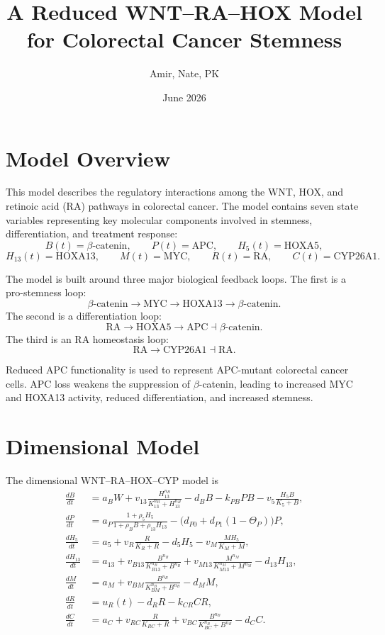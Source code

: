 \documentclass[11pt]{article}
\title{A Reduced WNT--RA--HOX Model for Colorectal Cancer Stemness}
\author{Amir, Nate, PK}
\date{June 2026}
\begin{document}
\maketitle

\section{Model Overview}

This model describes the regulatory interactions among the WNT, HOX, and
retinoic acid (RA) pathways in colorectal cancer. The model contains seven
state variables representing key molecular components involved in stemness,
differentiation, and treatment response:
\[
B(t)=\text{$\beta$-catenin}, \qquad
P(t)=\text{APC}, \qquad
H_5(t)=\text{HOXA5},
\]
\[
H_{13}(t)=\text{HOXA13}, \qquad
M(t)=\text{MYC}, \qquad
R(t)=\text{RA}, \qquad
C(t)=\text{CYP26A1}.
\]

The model is built around three major biological feedback loops. The first is
a pro-stemness loop:
\[
\beta\text{-catenin}
\longrightarrow
\text{MYC}
\longrightarrow
\text{HOXA13}
\longrightarrow
\beta\text{-catenin}.
\]
The second is a differentiation loop:
\[
\text{RA}
\longrightarrow
\text{HOXA5}
\longrightarrow
\text{APC}
\dashv
\beta\text{-catenin}.
\]
The third is an RA homeostasis loop:
\[
\text{RA}
\longrightarrow
\text{CYP26A1}
\dashv
\text{RA}.
\]

Reduced APC functionality is used to represent APC-mutant colorectal cancer
cells. APC loss weakens the suppression of $\beta$-catenin, leading to
increased MYC and HOXA13 activity, reduced differentiation, and increased
stemness.

\section{Dimensional Model}

The dimensional WNT--RA--HOX--CYP model is
\begin{align}
\frac{dB}{dt}
&=
a_BW
+
v_{13}\frac{H_{13}^{n_H}}{K_{13}^{n_H}+H_{13}^{n_H}}
-
d_BB
-
k_{PB}PB
-
v_5\frac{H_5B}{K_5+B},
\\
\frac{dP}{dt}
&=
a_P
\frac{1+\rho_5H_5}
{1+\rho_BB+\rho_{13}H_{13}}
-
\Big(d_{P0}+d_{P1}(1-\Theta_P)\Big)P,
\\
\frac{dH_5}{dt}
&=
a_5
+
v_R\frac{R}{K_R+R}
-
d_5H_5
-
v_M\frac{MH_5}{K_M+M},
\\
\frac{dH_{13}}{dt}
&=
a_{13}
+
v_{B13}\frac{B^{n_B}}{K_{B13}^{n_B}+B^{n_B}}
+
v_{M13}\frac{M^{n_M}}{K_{M13}^{n_M}+M^{n_M}}
-
d_{13}H_{13},
\\
\frac{dM}{dt}
&=
a_M
+
v_{BM}\frac{B^{n_B}}{K_{BM}^{n_B}+B^{n_B}}
-
d_MM,
\\
\frac{dR}{dt}
&=
u_R(t)
-
d_RR
-
k_{CR}CR,
\\
\frac{dC}{dt}
&=
a_C
+
v_{RC}\frac{R}{K_{RC}+R}
+
v_{BC}\frac{B^{n_B}}{K_{BC}^{n_B}+B^{n_B}}
-
d_CC.
\end{align}
\end{document}

